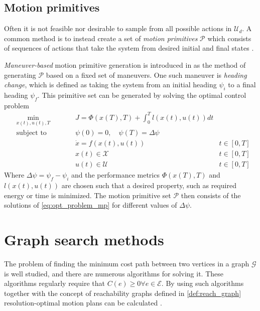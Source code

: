 \subsection{Motion primitives}\label{sec:motion_prim}
Often it is not feasible nor desirable to sample from all possible actions in $\mathcal{U}_d$.
A common method is to instead create a set of \textit{motion primitives} $\mathcal{P}$ which consists of 
sequences of actions that take the system from desired initial and final states \cite{state_lattice_planning}.

\textit{Maneuver-based} motion primitive generation is introduced in \cite{Bergman_lic} as
the method of generating $\mathcal{P}$ based on a fixed set of maneuvers. One such 
maneuver is \textit{heading change}, which is defined as taking the system from an initial heading $\psi_i$ to a final heading $\psi_f$.
This primitive set can be generated by solving the optimal control problem
\begin{subequations}
    \label{eq:opt_problem_mp}
    \begin{alignat}{3}
    &\min_{x(t),u(t),T}        &\qquad& J=\Phi(x(T),T) + \int_{0}^{T} l(x(t),u(t))dt & \\
    &\text{subject to} & & \psi(0)=0,\quad \psi(T)=\Delta\psi &\\
    & & & \dot{x}=f(x(t), u(t)) &t\in[0,T]\\
    & & & x(t)\in\mathcal{X}& t\in[0,T]\\
    & & & u(t)\in\mathcal{U} & t\in[0,T]
    \end{alignat}
\end{subequations}
Where $\Delta\psi=\psi_f-\psi_i$ and the performance metrics $\Phi(x(T), T)$ and $l(x(t),u(t))$ are chosen such that a desired property, such as 
required energy or time is minimized. The motion primitive set $\mathcal{P}$ then consists of the 
solutions of \eqref{eq:opt_problem_mp} for different values of $\Delta\psi$.
\section{Graph search methods}
The problem of finding the minimum cost path between two vertices in a graph $\mathcal{G}$
is well studied, and there are numerous algorithms for solving it. These algorithms regularly require that 
$C(e)\geq0 \forall e\in\mathcal{E}$. By using such algorithms together with the concept of 
reachability graphs defined in \eqref{def:reach_graph} resolution-optimal motion plans can be calculated \cite{Bergman_lic}. 

